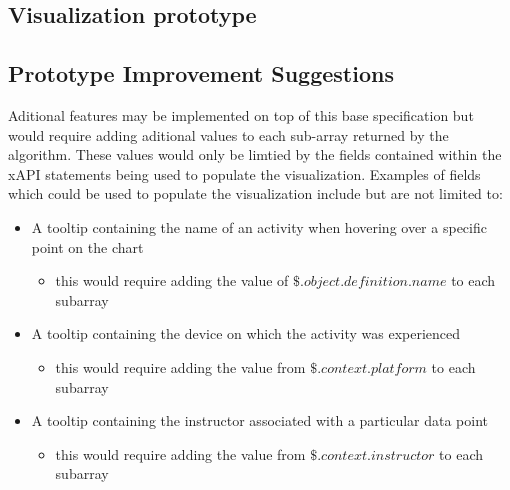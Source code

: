\documentclass{article}
\begin{document}
\subsection{Visualization prototype}


\subsection{Prototype Improvement Suggestions}
Aditional features may be implemented on top of
this base specification but would require adding aditional values to
each sub-array returned by the algorithm. These values would only be
limtied by the fields contained within the xAPI statements being
used to populate the visualization. Examples of fields which could be
used to populate the visualization include but are not limited to:
\begin{itemize}
\item A tooltip containing the name of an activity when hovering
  over a specific point on the chart
  \begin{itemize}
    \item this would require adding the value of
  $\$.object.definition.name$ to each subarray
  \end{itemize}
\item A tooltip containing the device on which the activity was experienced
  \begin{itemize}
    \item this would require adding the value from
  $\$.context.platform$ to each subarray
  \end{itemize}
\item A tooltip containing the instructor associated with a
  particular data point
  \begin{itemize}
    \item this would require adding the value from
  $\$.context.instructor$ to each subarray
  \end{itemize}
\end{itemize}
\end{document}
